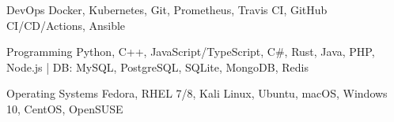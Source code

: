 

\begin{cvskills}

  \cvskill
    {DevOps} %
    {Docker, Kubernetes, Git, Prometheus, Travis CI, GitHub CI/CD/Actions, Ansible} %

  \cvskill
    {Programming} %
    {Python, C++, JavaScript/TypeScript, C\#, Rust, Java, PHP, Node.js | DB: MySQL, PostgreSQL, SQLite, MongoDB, Redis} %
    
    
  \cvskill
    {Operating Systems} %
    {Fedora, RHEL 7/8, Kali Linux, Ubuntu, macOS, Windows 10, CentOS, OpenSUSE} %
%

\end{cvskills}
\vspace{-3.0mm}